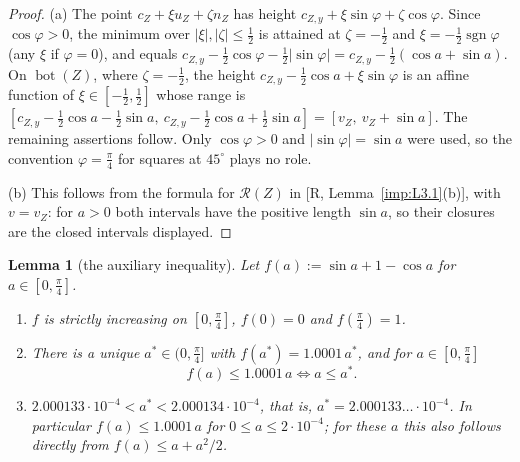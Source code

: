 \documentclass[11pt]{amsart}
\newcommand{\cR}{\mathcal R}
\newcommand{\Bot}{\operatorname{bot}}
\newtheorem{lemma}[theorem]{Lemma}
\theoremstyle{definition}
\theoremstyle{remark}
\numberwithin{equation}{section}
\begin{document}
\begin{proof}
(a) The point $c_Z+\xi u_Z+\zeta n_Z$ has height $c_{Z,y}+\xi\sin\varphi+\zeta\cos\varphi$. Since $\cos\varphi>0$, the minimum over $|\xi|,|\zeta|\le\frac12$ is attained at $\zeta=-\frac12$ and $\xi=-\frac12\operatorname{sgn}\varphi$ (any $\xi$ if $\varphi=0$), and equals $c_{Z,y}-\frac12\cos\varphi-\frac12|\sin\varphi|=c_{Z,y}-\frac12(\cos a+\sin a)$. On $\Bot(Z)$, where $\zeta=-\frac12$, the height $c_{Z,y}-\frac12\cos a+\xi\sin\varphi$ is an affine function of $\xi\in[-\frac12,\frac12]$ whose range is $[c_{Z,y}-\frac12\cos a-\frac12\sin a,\ c_{Z,y}-\frac12\cos a+\frac12\sin a]=[v_Z,\ v_Z+\sin a]$. The remaining assertions follow. Only $\cos\varphi>0$ and $|\sin\varphi|=\sin a$ were used, so the convention $\varphi=\frac\pi4$ for squares at $45^\circ$ plays no role.

(b) This follows from the formula for $\cR(Z)$ in [R, Lemma~\ref{imp:L3.1}(b)], with $v=v_Z$: for $a>0$ both intervals have the positive length $\sin a$, so their closures are the closed intervals displayed.
\end{proof}

\begin{lemma}[the auxiliary inequality]\label{lem:P12-aux}
Let $f(a):=\sin a+1-\cos a$ for $a\in[0,\frac\pi4]$.
\begin{enumerate}[label=\textup{(\alph*)}]
\item $f$ is strictly increasing on $[0,\frac\pi4]$, $f(0)=0$ and $f(\frac\pi4)=1$.
\item There is a unique $a^*\in(0,\frac\pi4]$ with $f(a^*)=1.0001\,a^*$, and for $a\in[0,\frac\pi4]$
\[
f(a)\le1.0001\,a\iff a\le a^* .
\]
\item $2.000133\cdot10^{-4}<a^*<2.000134\cdot10^{-4}$, that is, $a^*=2.000133\ldots\cdot10^{-4}$. In particular $f(a)\le1.0001\,a$ for $0\le a\le2\cdot10^{-4}$; for these $a$ this also follows directly from $f(a)\le a+a^2/2$.
\end{enumerate}
\end{lemma}
\end{document}
